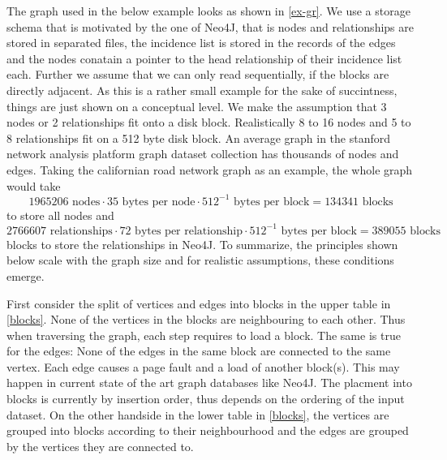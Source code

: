   The graph used in the below example looks as shown in \ref{ex-gr}.
  We use a storage schema that is motivated by the one of Neo4J, that is nodes and relationships are stored in separated files, the incidence list is stored in the records of the edges and the nodes conatain a pointer to the head relationship of their incidence list each. Further we assume that we can only read sequentially, if the blocks are directly adjacent.
  As this is a rather small example for the sake of succintness, things are just shown on a conceptual level. 
  We make the assumption that 3 nodes or 2 relationships fit onto a disk block. 
  Realistically 8 to 16 nodes and 5 to 8 relationships fit on a 512 byte disk block. 
  An average graph in the stanford network analysis platform graph dataset collection has thousands of nodes and edges. 
  Taking the californian road network graph as an example, the whole graph would take 
  \[ 1 965 206 \text{ nodes} \cdot 35 \text{ bytes per node} \cdot 512^{-1} \text{ bytes per block} = 134 341\text{ blocks}\] 
  to store all nodes and 
  \[2 766 607 \text{ relationships} \cdot 72 \text{ bytes per relationship} \cdot 512^{-1} \text{ bytes per block} = 389055\text{ blocks}\] 
  blocks to store the relationships in Neo4J.
  To summarize, the principles shown below scale with the graph size and for realistic assumptions, these conditions emerge.

  First consider the split of vertices and edges into blocks in the upper table in \ref{blocks}. 
  None of the vertices in the blocks are neighbouring to each other.
  Thus when traversing the graph, each step requires to load a block.
  The same is true for the edges: 
  None of the edges in the same block are connected to the same vertex. 
  Each edge causes a page fault and a load of another block(s).
  This may happen in current state of the art graph databases like Neo4J. 
  The placment into blocks is currently by insertion order, thus depends on the ordering of the input dataset. 
  On the other handside in the lower table in \ref{blocks}, the vertices are grouped into blocks according to their neighbourhood and the edges are grouped by the vertices they are connected to.


